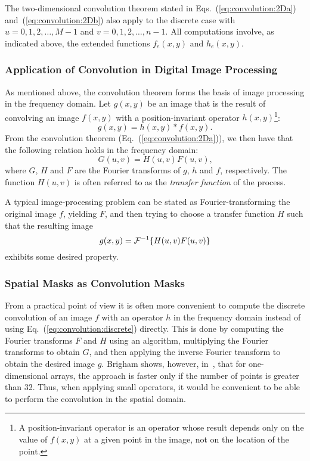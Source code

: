 The two-dimensional convolution theorem stated in
Eqs.~(\ref{eq:convolution:2Da}) and~(\ref{eq:convolution:2Db}) also
apply to the discrete case with $u=0,1,2,\ldots,M-1$ and
$v=0,1,2,\ldots,n-1$.  All computations involve, as indicated above,
the extended functions $f_{e}(x,y)$ and $h_{e}(x,y)$.

\subsubsection{Application of Convolution in Digital Image Processing}

As mentioned above, the convolution theorem forms the basis of image
processing in the frequency domain.  Let $g(x,y)$ be an image that is
the result of convolving an image $f(x,y)$ with a position-invariant
operator $h(x,y)$\footnote{A position-invariant operator is an
  operator whose result depends only on the value of $f(x,y)$ at a
  given point in the image, not on the location of the point.}:
\begin{equation}
\label{eq:convolution:operator}
  g(x,y)=h(x,y)\ast f(x,y)\mbox{.}
\end{equation}
From the convolution theorem (Eq.~(\ref{eq:convolution:2Da})), we then
have that the following relation holds in the frequency domain:
\begin{equation}
  G(u,v)=H(u,v)F(u,v)\mbox{,}
\end{equation}
where $G$, $H$ and $F$ are the Fourier transforms of $g$, $h$ and $f$,
respectively.  The function $H(u,v)$ is often referred to as the {\em
  transfer function\/} of the process.

A typical image-processing problem can be stated as
Fourier-transforming the original image $f$, yielding $F$, and then
trying to choose a transfer function $H$ such that the resulting image
\begin{equation}
  g(x,y)={\cal F}^{-1}\{H(u,v)F(u,v)\}
\end{equation}
exhibits some desired property.

\subsubsection{Spatial Masks as Convolution Masks}

From a practical point of view it is often more convenient to compute
the discrete convolution of an image $f$ with an operator $h$ in the
frequency domain instead of using Eq.~(\ref{eq:convolution:discrete})
directly.  This is done by computing the Fourier transforms $F$ and
$H$ using an {\fft} algorithm, multiplying the Fourier transforms to
obtain $G$, and then applying the inverse Fourier transform to obtain
the desired image $g$.  Brigham shows, however, in~\cite{brigham},
that for one-dimensional arrays, the {\fft} approach is faster only if
the number of points is greater than 32.  Thus, when applying small
operators, it would be convenient to be able to perform the
convolution in the spatial domain.

